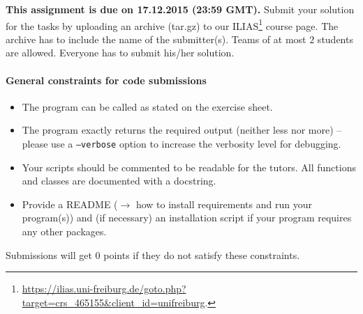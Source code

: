 \documentclass{exam}
\begin{document}


\noindent
{\bf This assignment is due on 17.12.2015 (23:59 GMT).} Submit your solution for the tasks by uploading an archive (tar.gz) to our ILIAS\footnote{ \url{https://ilias.uni-freiburg.de/goto.php?target=crs_465155&client_id=unifreiburg}.} course page. The archive has to include the name of the submitter(s). Teams of at most $2$ students are allowed. Everyone has to submit his/her solution. 

\bigskip
\paragraph{General constraints for code submissions}

\begin{itemize}
  \item The program can be called as stated on the exercise sheet.
  \item The program exactly returns the required output (neither less nor more) -- please use a \texttt{--verbose} option to increase the verbosity level for debugging.
  \item Your scripts should be commented to be readable for the tutors. All functions and classes are documented with a docstring. 
  \item Provide a README ($\to$ how to install requirements and run your program(s)) and (if necessary) an installation script if your program requires any other packages.
\end{itemize}

\bigskip

Submissions will get $0$ points if they do not satisfy these constraints.
\end{document}
